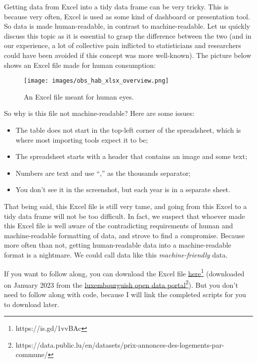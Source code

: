 \documentclass[
  letterpaper,
  DIV=11,
  numbers=noendperiod]{scrartcl}
\providecommand{\tightlist}{%
  \setlength{\itemsep}{0pt}\setlength{\parskip}{0pt}}\usepackage{longtable,booktabs,array}
\begin{document}
Getting data from Excel into a tidy data frame can be very tricky. This
is because very often, Excel is used as some kind of dashboard or
presentation tool. So data is made human-readable, in contrast to
machine-readable. Let us quickly discuss this topic as it is essential
to grasp the difference between the two (and in our experience, a lot of
collective pain inflicted to statisticians and researchers could have
been avoided if this concept was more well-known). The picture below
shows an Excel file made for human consumption:

\begin{figure}

{\centering \texttt{[image: images/obs\_hab\_xlsx\_overview.png]}

}

\caption{An Excel file meant for human eyes.}

\end{figure}

So why is this file not machine-readable? Here are some issues:

\begin{itemize}
\tightlist
\item
  The table does not start in the top-left corner of the spreadsheet,
  which is where most importing tools expect it to be;
\item
  The spreadsheet starts with a header that contains an image and some
  text;
\item
  Numbers are text and use ``,'' as the thousands separator;
\item
  You don't see it in the screenshot, but each year is in a separate
  sheet.
\end{itemize}

That being said, this Excel file is still very tame, and going from this
Excel to a tidy data frame will not be too difficult. In fact, we
suspect that whoever made this Excel file is well aware of the
contradicting requirements of human and machine-readable formatting of
data, and strove to find a compromise. Because more often than not,
getting human-readable data into a machine-readable format is a
nightmare. We could call data like this \emph{machine-friendly} data.

If you want to follow along, you can download the Excel file
\href{https://github.com/b-rodrigues/rap4all/raw/master/datasets/vente-maison-2010-2021.xlsx}{here}\footnote{https://is.gd/1vvBAc}
(downloaded on January 2023 from the
\href{https://data.public.lu/en/datasets/prix-annonces-des-logements-par-commune/}{luxembourguish
open data portal}\footnote{https://data.public.lu/en/datasets/prix-annonces-des-logements-par-commune/}).
But you don't need to follow along with code, because I will link the
completed scripts for you to download later.
\end{document}
